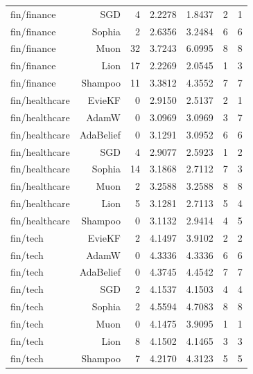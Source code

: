 \begin{table}[t]
\begin{tabular}{lrrrrrr}
fin/finance & SGD & 4 & 2.2278 & 1.8437 & 2 & 1 \\
fin/finance & Sophia & 2 & 2.6356 & 3.2484 & 6 & 6 \\
fin/finance & Muon & 32 & 3.7243 & 6.0995 & 8 & 8 \\
fin/finance & Lion & 17 & 2.2269 & 2.0545 & 1 & 3 \\
fin/finance & Shampoo & 11 & 3.3812 & 4.3552 & 7 & 7 \\
fin/healthcare & EvieKF & 0 & 2.9150 & 2.5137 & 2 & 1 \\
fin/healthcare & AdamW & 0 & 3.0969 & 3.0969 & 3 & 7 \\
fin/healthcare & AdaBelief & 0 & 3.1291 & 3.0952 & 6 & 6 \\
fin/healthcare & SGD & 4 & 2.9077 & 2.5923 & 1 & 2 \\
fin/healthcare & Sophia & 14 & 3.1868 & 2.7112 & 7 & 3 \\
fin/healthcare & Muon & 2 & 3.2588 & 3.2588 & 8 & 8 \\
fin/healthcare & Lion & 5 & 3.1281 & 2.7113 & 5 & 4 \\
fin/healthcare & Shampoo & 0 & 3.1132 & 2.9414 & 4 & 5 \\
fin/tech & EvieKF & 2 & 4.1497 & 3.9102 & 2 & 2 \\
fin/tech & AdamW & 0 & 4.3336 & 4.3336 & 6 & 6 \\
fin/tech & AdaBelief & 0 & 4.3745 & 4.4542 & 7 & 7 \\
fin/tech & SGD & 2 & 4.1537 & 4.1503 & 4 & 4 \\
fin/tech & Sophia & 2 & 4.5594 & 4.7083 & 8 & 8 \\
fin/tech & Muon & 0 & 4.1475 & 3.9095 & 1 & 1 \\
fin/tech & Lion & 8 & 4.1502 & 4.1465 & 3 & 3 \\
fin/tech & Shampoo & 7 & 4.2170 & 4.3123 & 5 & 5 \\
\bottomrule
\end{tabular}
\end{table}
